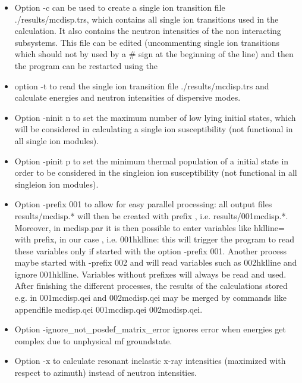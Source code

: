 \begin{description}
\begin{itemize}
				\item Option {\prg -c}  can be used to create  a single ion
				transition file {\prg ./results/mcdisp.trs}, which contains
				all single ion transitions used in the calculation. It also contains the 
                                    neutron intensities of the non interacting subsystems. This file can
				be edited (uncommenting single ion transitions which should not
				by used by a \# sign at the beginning of the line)
				and then the program can be restarted using the 
				\item  option {\prg -t} to
				read the single ion transition file {\prg ./results/mcdisp.trs} and
				calculate energies and neutron intensities of dispersive modes.
				\item Option {\prg -ninit n} to set the maximum number of low lying
                                 initial states, which will be considered in calculating a single ion susceptibility (not functional
                                 in all single ion modules).
 \item Option {\prg -pinit p} to set the minimum thermal population of a 
                                 initial state in order to be considered in the singleion ion susceptibility (not functional in
                                 all singleion ion modules).
 \item Option {\prg -prefix 001} to allow for easy parallel processing: all output files {\prg results/mcdisp.*}
                  will then be created with prefix {}, i.e. {\prg results/001mcdisp.*}.
                  Moreover,  in {\prg mcdisp.par} it is then possible to enter
                  variables like {\prg hklline=}  with prefix, in our case {}, i.e. {\prg 001hklline}: this will trigger
                  the program to read these variables only if started with the option {\prg -prefix 001}. Another process
                  maybe started with {\prg -prefix 002} and will read variables such as {\prg 002hklline} and ignore {\prg 001hklline}.
                  Variables without prefixes will always be read and used.
                  After finishing the different processes, the results of the calculations stored e.g. in {\prg 001mcdisp.qei} and
                  {\prg 002mcdisp.qei} may be merged by commands like {\prg appendfile mcdisp.qei 001mcdisp.qei 002mcdisp.qei}.
    \item Option {\prg -ignore\_not\_posdef\_matrix\_error} ignores error when energies get complex due to unphysical mf groundstate.
    \item Option {\prg -x} to calculate resonant inelastic x-ray intensities (maximized with respect to azimuth) instead of neutron intensities.

\end{itemize}
\end{description}
